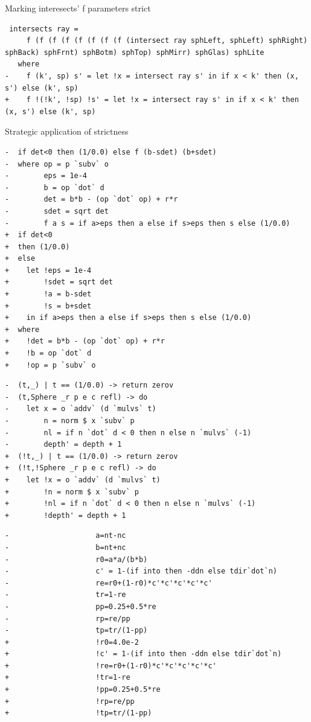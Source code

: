 \documentclass[8pt]{beamer}
\begin{document}
\begin{frame}[fragile]{Marking interesects' f parameters strict}

\begin{verbatim}
 intersects ray =
     f (f (f (f (f (f (f (f (intersect ray sphLeft, sphLeft) sphRight) sphBack) sphFrnt) sphBotm) sphTop) sphMirr) sphGlas) sphLite
   where
-    f (k', sp) s' = let !x = intersect ray s' in if x < k' then (x, s') else (k', sp)
+    f !(!k', !sp) !s' = let !x = intersect ray s' in if x < k' then (x, s') else (k', sp)
\end{verbatim}
\end{frame}


\begin{frame}[fragile]{Strategic application of strictness}
\begin{verbatim}
-  if det<0 then (1/0.0) else f (b-sdet) (b+sdet)
-  where op = p `subv` o
-        eps = 1e-4
-        b = op `dot` d
-        det = b*b - (op `dot` op) + r*r
-        sdet = sqrt det
-        f a s = if a>eps then a else if s>eps then s else (1/0.0)
+  if det<0
+  then (1/0.0)
+  else
+    let !eps = 1e-4
+        !sdet = sqrt det
+        !a = b-sdet
+        !s = b+sdet
+    in if a>eps then a else if s>eps then s else (1/0.0)
+  where
+    !det = b*b - (op `dot` op) + r*r
+    !b = op `dot` d
+    !op = p `subv` o
\end{verbatim}

\begin{verbatim}
-  (t,_) | t == (1/0.0) -> return zerov
-  (t,Sphere _r p e c refl) -> do
-    let x = o `addv` (d `mulvs` t)
-        n = norm $ x `subv` p
-        nl = if n `dot` d < 0 then n else n `mulvs` (-1)
-        depth' = depth + 1
+  (!t,_) | t == (1/0.0) -> return zerov
+  (!t,!Sphere _r p e c refl) -> do
+    let !x = o `addv` (d `mulvs` t)
+        !n = norm $ x `subv` p
+        !nl = if n `dot` d < 0 then n else n `mulvs` (-1)
+        !depth' = depth + 1
\end{verbatim}
\begin{verbatim}
-                    a=nt-nc
-                    b=nt+nc
-                    r0=a*a/(b*b)
-                    c' = 1-(if into then -ddn else tdir`dot`n)
-                    re=r0+(1-r0)*c'*c'*c'*c'*c'
-                    tr=1-re
-                    pp=0.25+0.5*re
-                    rp=re/pp
-                    tp=tr/(1-pp)
+                    !r0=4.0e-2
+                    !c' = 1-(if into then -ddn else tdir`dot`n)
+                    !re=r0+(1-r0)*c'*c'*c'*c'*c'
+                    !tr=1-re
+                    !pp=0.25+0.5*re
+                    !rp=re/pp
+                    !tp=tr/(1-pp)
\end{verbatim}

\end{frame}
\end{document}
